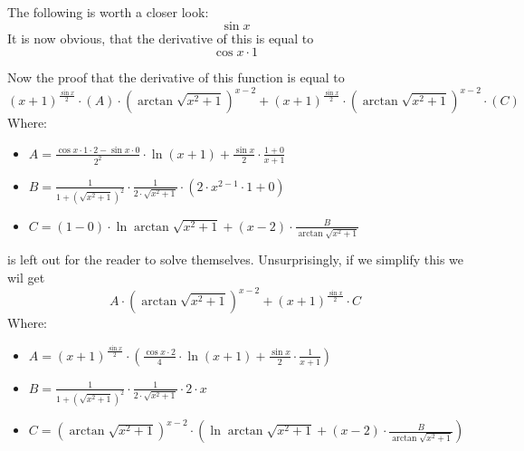\documentclass{article}
\begin{document}
The following is worth a closer look:
\begin{equation}
\sin x 
\end{equation}
It is now obvious, that the derivative of this is equal to
\begin{equation}
\cos x \cdot 1 
\end{equation}

Now the proof that the derivative of this function is equal to
\begin{equation}
\left( x + 1 \right) ^{\frac{\sin x }{2 } } \cdot \left( A \right) \cdot \left( \arctan \sqrt {x ^{2 } + 1 } \right) ^{x - 2 } + \left( x + 1 \right) ^{\frac{\sin x }{2 } } \cdot \left( \arctan \sqrt {x ^{2 } + 1 } \right) ^{x - 2 } \cdot \left( C \right) 
\end{equation}
Where:
\begin{itemize}
	\item $A = \frac{\cos x \cdot 1 \cdot 2 - \sin x \cdot 0 }{2 ^{2 } } \cdot \ln \left( x + 1 \right) + \frac{\sin x }{2 } \cdot \frac{1 + 0 }{x + 1 } $
	\item $B = \frac{1 }{1 + \left( \sqrt {x ^{2 } + 1 } \right) ^{2 } } \cdot \frac{1 }{2 \cdot \sqrt {x ^{2 } + 1 } } \cdot \left( 2 \cdot x ^{2 - 1 } \cdot 1 + 0 \right) $
	\item $C = \left( 1 - 0 \right) \cdot \ln \arctan \sqrt {x ^{2 } + 1 } + \left( x - 2 \right) \cdot \frac{B }{\arctan \sqrt {x ^{2 } + 1 } } $
\end{itemize}

is left out for the reader to solve themselves.
Unsurprisingly, if we simplify this we wil get
\begin{equation}
A \cdot \left( \arctan \sqrt {x ^{2 } + 1 } \right) ^{x - 2 } + \left( x + 1 \right) ^{\frac{\sin x }{2 } } \cdot C 
\end{equation}
Where:
\begin{itemize}
	\item $A = \left( x + 1 \right) ^{\frac{\sin x }{2 } } \cdot \left( \frac{\cos x \cdot 2 }{4 } \cdot \ln \left( x + 1 \right) + \frac{\sin x }{2 } \cdot \frac{1 }{x + 1 } \right) $
	\item $B = \frac{1 }{1 + \left( \sqrt {x ^{2 } + 1 } \right) ^{2 } } \cdot \frac{1 }{2 \cdot \sqrt {x ^{2 } + 1 } } \cdot 2 \cdot x $
	\item $C = \left( \arctan \sqrt {x ^{2 } + 1 } \right) ^{x - 2 } \cdot \left( \ln \arctan \sqrt {x ^{2 } + 1 } + \left( x - 2 \right) \cdot \frac{B }{\arctan \sqrt {x ^{2 } + 1 } } \right) $
\end{itemize}
\end{document}
